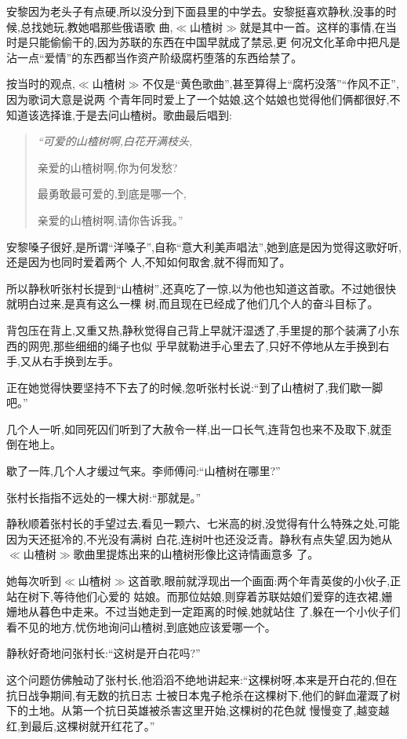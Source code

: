 ﻿\documentclass[12pt]{article}
\begin{document}
安黎因为老头子有点硬,所以没分到下面县里的中学去。安黎挺喜欢静秋,没事的时候,总找她玩,教她唱那些俄语歌
曲,$\ll$山楂树$\gg$就是其中一首。这样的事情,在当时是只能偷偷干的,因为苏联的东西在中国早就成了禁忌,更
何况文化革命中把凡是沾一点``爱情''的东西都当作资产阶级腐朽堕落的东西给禁了。

按当时的观点,$\ll$山楂树$\gg$不仅是``黄色歌曲'',甚至算得上``腐朽没落''``作风不正'',因为歌词大意是说两
个青年同时爱上了一个姑娘,这个姑娘也觉得他们俩都很好,不知道该选择谁,于是去问山楂树。歌曲最后唱到:
\begin{verse} {\itshape ``可爱的山楂树啊,白花开满枝头,

亲爱的山楂树啊,你为何发愁?

最勇敢最可爱的,到底是哪一个,

亲爱的山楂树啊,请你告诉我。'' }\end{verse}

安黎嗓子很好,是所谓``洋嗓子'',自称``意大利美声唱法'',她到底是因为觉得这歌好听,还是因为也同时爱着两个
人,不知如何取舍,就不得而知了。

所以静秋听张村长提到``山楂树'',还真吃了一惊,以为他也知道这首歌。不过她很快就明白过来,是真有这么一棵
树,而且现在已经成了他们几个人的奋斗目标了。

背包压在背上,又重又热,静秋觉得自己背上早就汗湿透了,手里提的那个装满了小东西的网兜,那些细细的绳子也似
乎早就勒进手心里去了,只好不停地从左手换到右手,又从右手换到左手。

正在她觉得快要坚持不下去了的时候,忽听张村长说:``到了山楂树了,我们歇一脚吧。''

几个人一听,如同死囚们听到了大赦令一样,出一口长气,连背包也来不及取下,就歪倒在地上。

歇了一阵,几个人才缓过气来。李师傅问:``山楂树在哪里?''

张村长指指不远处的一棵大树:``那就是。''

静秋顺着张村长的手望过去,看见一颗六、七米高的树,没觉得有什么特殊之处,可能因为天还挺冷的,不光没有满树
白花,连树叶也还没泛青。静秋有点失望,因为她从$\ll$山楂树$\gg$歌曲里提炼出来的山楂树形像比这诗情画意多
了。

她每次听到$\ll$山楂树$\gg$这首歌,眼前就浮现出一个画面:两个年青英俊的小伙子,正站在树下,等待他们心爱的
姑娘。而那位姑娘,则穿着苏联姑娘们爱穿的连衣裙,姗姗地从暮色中走来。不过当她走到一定距离的时候,她就站住
了,躲在一个小伙子们看不见的地方,忧伤地询问山楂树,到底她应该爱哪一个。

静秋好奇地问张村长:``这树是开白花吗?''

这个问题仿佛触动了张村长,他滔滔不绝地讲起来:``这棵树呀,本来是开白花的,但在抗日战争期间,有无数的抗日志
士被日本鬼子枪杀在这棵树下,他们的鲜血灌溉了树下的土地。从第一个抗日英雄被杀害这里开始,这棵树的花色就
慢慢变了,越变越红,到最后,这棵树就开红花了。''
\end{document}
